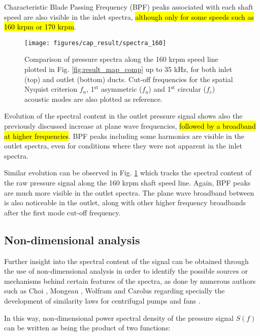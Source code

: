 Characteristic Blade Passing Frequency (BPF) peaks associated with each shaft speed are also visible in the inlet spectra, \hl{although only for some speeds such as 160 krpm or 170 krpm}. 

\begin{figure}[tbh!]
\centering
\texttt{[image: figures/cap\_result/spectra\_160]}
\caption{Comparison of pressure spectra along the 160 krpm speed line plotted in Fig. \ref{fig:result_map_comp} up to 35 kHz, for both inlet (top) and outlet (bottom) ducts. Cut-off frequencies for the spatial Nyquist criterion $f_n$, 1${}^\text{st}$ asymmetric ($f_a$) and 1${}^\text{st}$ circular ($f_c$) acoustic modes are also plotted as reference.}
\label{fig:result_spectra_160}
\end{figure}

Evolution of the spectral content in the outlet pressure signal shows also the previously discussed increase at plane wave frequencies, \hl{followed by a broadband at higher frequencies}. BPF peaks including some harmonics are visible in the outlet spectra, even for conditions where they were not apparent in the inlet spectra.

Similar evolution can be observed in Fig. \ref{fig:result_spectra_160} which tracks the spectral content of the raw pressure signal along the 160 krpm shaft speed line. Again, BPF peaks are much more visible in the outlet spectra. The plane wave broadband between is also noticeable in the outlet, along with other higher frequency broadbands after the first mode cut-off frequency.

\subsection{Non-dimensional analysis}

Further insight into the spectral content of the signal can be obtained through the use of non-dimensional analysis in order to identify the possible sources or mechanisms behind certain features of the spectra, as done by numerous authors such as Choi \cite{choi1994aerodynamic,choi2003experiments}, Mongeau \cite{mongeau1993sound,mongeau1995method}, Wolfram \cite{wolfram2009detection,wolfram2010experimental} and Carolus \cite{carolus2000experimental} regarding specially the development of similarity laws for centrifugal pumps and fans \cite{neise1982acoustic}.

In this way, non-dimensional power spectral density of the pressure signal $S(f)$ can be written \cite{mongeau1993sound,choi1994aerodynamic} as being the product of two functions: 

